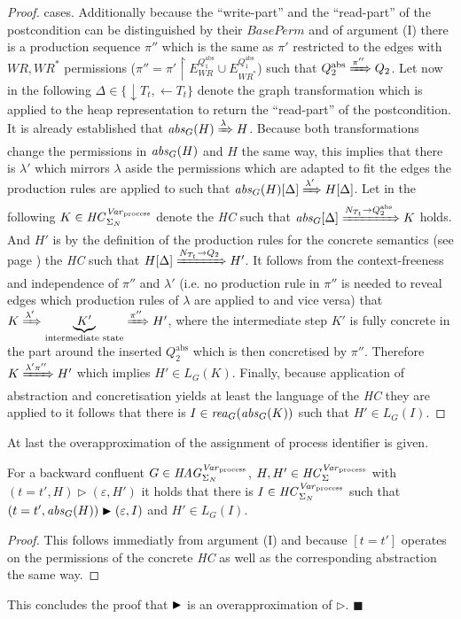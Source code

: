 \begin{proof}
		cases.
		Additionally because the \enquote{write-part} and the \enquote{read-part}
		of the postcondition can be distinguished by their $\mathit{BasePerm}$
		and of argument (I) there is a production sequence $\pi''$ which is
		the same as $\pi'$ restricted to the edges with
		$\mathit{WR},\mathit{WR}^{\ast}$ permissions ($\pi'' =\pi'\upharpoonright
		E^{Q_{1}^{\text{abs}}}_{\mathit{WR}}\cup
		E^{Q_{1}^{\text{abs}}}_{\mathit{WR}^{\ast}}$) such that
		$Q_{2}^{\text{abs}}\xRightarrow{\pi''}Q_{2}$. Let now in the following
		$\Delta\in\{\downarrow T_t,\leftarrow T_t\}$ denote the graph
		transformation which is applied to the heap representation to return the
		\enquote{read-part} of the postcondition. It is already established that
		$\mathit{abs}_{G}(H)\xRightarrow{\lambda}H$. Because both transformations change
		the permissions in $\mathit{abs}_{G}(H)$ and $H$ the same way, this implies that
		there is $\lambda'$ which mirrors $\lambda$ aside the permissions which
		are adapted to fit the edges the production rules are applied to such
		that $\mathit{abs}_{G}(H)[\Delta]\xRightarrow{\lambda'}H[\Delta]$. Let in the
		following $K\in\mathit{HC}_{\Sigma_{N}}^{\mathit{Var}_{\text{process}}}$ denote the \emph{\ac{HC}} such that
		$\mathit{abs}_{G}[\Delta] \xRightarrow{N_{T_t}\rightarrow Q_{2}^{\text{abs}}} K$
		holds. And $H'$ is by the definition of the production rules for the
		concrete semantics (see page \pageref{prooftree:join}) the \emph{\ac{HC}}
		such that $H[\Delta]\xRightarrow{N_{T_t}\rightarrow Q_{2}} H'$. It
		follows from the context-freeness and independence of $\pi''$ and
		$\lambda'$ (i.e. no production rule in $\pi''$ is needed to reveal edges
		which production rules of $\lambda$ are applied to and vice versa) that
		$K\xRightarrow{\lambda'} \underbrace{K'}_{\text{intermediate state}}
			\xRightarrow{\pi''} H'$, where the intermediate step $K'$ is fully
		concrete in the part around the inserted $Q_{2}^{\text{abs}}$ which is
		then concretised by $\pi''$.
		Therefore
		$K\xRightarrow{\lambda'\pi''}H'$ which implies $H'\in L_{G}(K)$.
		Finally, because application of abstraction and concretisation yields at
		least the language of the \emph{\ac{HC}} they are applied to it follows
		that there is $I\in\mathit{rea}_{G}(\mathit{abs}_{G}(K))$ such that $H'\in L_{G}(I)$.
	\end{proof}
	At last the overapproximation of the assignment of process identifier is
	given.
	\begin{lemma}
		For a backward confluent $G\in\mathit{HAG}_{\Sigma_{N}}^{\mathit{Var}_{\text{process}}}$, $H,H'\in\mathit{HC}_{\Sigma}^{\mathit{Var}_{\text{process}}}$ with
		$(t = t',H)\rhd(\varepsilon, H')$
		it holds that there is $I\in\mathit{HC}_{\Sigma_{N}}^{\mathit{Var}_{\text{process}}}$ such that
		$(t = t',\mathit{abs}_{G}(H))
			\blacktriangleright(\varepsilon,I)$ and $H'\in L_{G}(I)$.
	\end{lemma}
	\begin{proof}
		This follows immediatly from argument (I) and because $[t = t']$ operates
		on the permissions of the concrete \emph{\ac{HC}} as well as the
		corresponding abstraction the same way.
	\end{proof}
	This concludes the proof that $\blacktriangleright$ is an overapproximation of $\rhd$.
	$\blacksquare$
